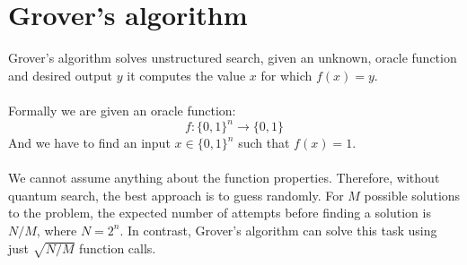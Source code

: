 \section{Grover's algorithm}
Grover's algorithm solves unstructured search, given an unknown, oracle function and desired output $y$ it computes the value $x$ for which $f(x)=y$. \\\\
Formally we are given an oracle function:
$$f:\{0,1\}^n\rightarrow \{0,1\}$$
And we have to find an input $x\in \{0,1\}^n$ such that $f(x)=1$. \\\\
We cannot assume anything about the function properties. Therefore, without quantum search, the best approach is to guess randomly. For $M$ possible solutions to the problem, the expected number of attempts before finding a solution is ${N}/{M}$, where $N=2^n$. In contrast, Grover's algorithm can solve this task using just $\sqrt{{N}/{M}}$ function calls.
